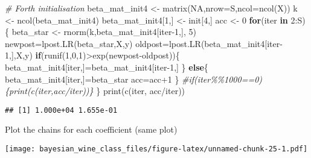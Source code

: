 \documentclass[
]{article}
\newenvironment{Shaded}{\begin{snugshade}}{\end{snugshade}}
\newcommand{\AttributeTok}[1]{\textcolor[rgb]{0.77,0.63,0.00}{#1}}
\newcommand{\CommentTok}[1]{\textcolor[rgb]{0.56,0.35,0.01}{\textit{#1}}}
\newcommand{\ConstantTok}[1]{\textcolor[rgb]{0.00,0.00,0.00}{#1}}
\newcommand{\ControlFlowTok}[1]{\textcolor[rgb]{0.13,0.29,0.53}{\textbf{#1}}}
\newcommand{\DecValTok}[1]{\textcolor[rgb]{0.00,0.00,0.81}{#1}}
\newcommand{\FunctionTok}[1]{\textcolor[rgb]{0.00,0.00,0.00}{#1}}
\newcommand{\NormalTok}[1]{#1}
\newcommand{\OtherTok}[1]{\textcolor[rgb]{0.56,0.35,0.01}{#1}}
\newcommand{\SpecialCharTok}[1]{\textcolor[rgb]{0.00,0.00,0.00}{#1}}
\begin{document}
\begin{Shaded}
\begin{Highlighting}[]
\CommentTok{\# Forth initialisation}
\NormalTok{beta\_mat\_init4 }\OtherTok{\textless{}{-}} \FunctionTok{matrix}\NormalTok{(}\ConstantTok{NA}\NormalTok{,}\AttributeTok{nrow=}\NormalTok{S,}\AttributeTok{ncol=}\FunctionTok{ncol}\NormalTok{(X))}
\NormalTok{k }\OtherTok{\textless{}{-}} \FunctionTok{ncol}\NormalTok{(beta\_mat\_init4)}
\NormalTok{beta\_mat\_init4[}\DecValTok{1}\NormalTok{,] }\OtherTok{\textless{}{-}}\NormalTok{ init[}\DecValTok{4}\NormalTok{,]}
\NormalTok{acc }\OtherTok{\textless{}{-}} \DecValTok{0}
\ControlFlowTok{for}\NormalTok{(iter }\ControlFlowTok{in} \DecValTok{2}\SpecialCharTok{:}\NormalTok{S)\{}
\NormalTok{  beta\_star }\OtherTok{\textless{}{-}} \FunctionTok{rnorm}\NormalTok{(k,beta\_mat\_init4[iter}\DecValTok{{-}1}\NormalTok{,], }\DecValTok{5}\NormalTok{)}
\NormalTok{  newpost}\OtherTok{=}\FunctionTok{lpost.LR}\NormalTok{(beta\_star,X,y)}
\NormalTok{  oldpost}\OtherTok{=}\FunctionTok{lpost.LR}\NormalTok{(beta\_mat\_init4[iter}\DecValTok{{-}1}\NormalTok{,],X,y)}
  \ControlFlowTok{if}\NormalTok{(}\FunctionTok{runif}\NormalTok{(}\DecValTok{1}\NormalTok{,}\DecValTok{0}\NormalTok{,}\DecValTok{1}\NormalTok{)}\SpecialCharTok{\textgreater{}}\FunctionTok{exp}\NormalTok{(newpost}\SpecialCharTok{{-}}\NormalTok{oldpost))\{}
\NormalTok{    beta\_mat\_init4[iter,]}\OtherTok{=}\NormalTok{beta\_mat\_init4[iter}\DecValTok{{-}1}\NormalTok{,]}
\NormalTok{  \} }\ControlFlowTok{else}\NormalTok{\{}
\NormalTok{    beta\_mat\_init4[iter,]}\OtherTok{=}\NormalTok{beta\_star}
\NormalTok{    acc}\OtherTok{=}\NormalTok{acc}\SpecialCharTok{+}\DecValTok{1}
\NormalTok{  \}}
  \CommentTok{\#if(iter\%\%1000==0)\{print(c(iter,acc/iter))\}}
\NormalTok{\}}
\FunctionTok{print}\NormalTok{(}\FunctionTok{c}\NormalTok{(iter, acc}\SpecialCharTok{/}\NormalTok{iter))}
\end{Highlighting}
\end{Shaded}

\begin{verbatim}
## [1] 1.000e+04 1.655e-01
\end{verbatim}

Plot the chains for each coefficient (same plot)

\texttt{[image: bayesian\_wine\_class\_files/figure-latex/unnamed-chunk-25-1.pdf]}

\begin{Shaded}
\end{Shaded}
\end{document}
